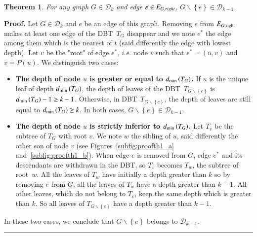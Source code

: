 \documentclass[preprint]{elsarticle}
\newtheorem{theorem}{Theorem}
\newenvironment{proof}[1][Proof]{\textbf{#1.} }{\ \rule{0.5em}{0.5em}}
\newcommand{\set}[1]{\left\{ #1 \right\}}
\newcommand{\card}[1]{\left| #1 \right|}
\newcommand{\mcalg}{\mathcal{G}}
\newcommand{\mcald}{\mathcal{D}}
\newcommand{\ebt}{DBT}
\newcommand{\compbin}[1]{\mathcal{C}_{\mbox{\scriptsize{B}}}\left( #1 \right)}
\newcommand{\dmin}{d_{\mbox{\scriptsize{min}}}}
\newcommand{\eright}[1]{E_{#1, \mbox{\scriptsize{right}}}}
\begin{document}
\begin{theorem}
For any graph $G \in \mcald_k$ and edge $e \in E_{G, \emph{right}}$, $G \backslash \set{e} \in \mcald_{k-1}$.
\label{th:completebinary}
\end{theorem}
\begin{proof}
Let $G \in \mcald_k$ and $e$ be an edge of this graph. Removing $e$ from $\eright{G}$ makes at least one edge of the \ebt ~$T_G$ disappear and we note $e^*$ the edge among them which is the nearest of $t$ (said differently the edge with lowest depth). Let $v$ be the "root" of edge $e^*$, {\em i.e.} node $v$ such that $e^* = (u, v)$ and $v = P(u)$. We distinguish two cases:
\begin{itemize}[leftmargin=0.3cm]
\item {\bf The depth of node $u$ is greater or equal to $\dmin\left(T_G\right)$.} If $u$ is the unique leaf of depth $\dmin\left(T_G\right)$, the depth of leaves of the \ebt ~$T_{G\backslash \set{e}}$ is $\dmin\left(T_G\right) - 1 \geq k-1$. Otherwise, in \ebt ~$T_{G\backslash \set{e}}$, the depth of leaves are still equal to $\dmin\left(T_G\right) \geq k$. In both cases, $G\backslash \set{e} \in \mcald_{k-1}$.
\item {\bf The depth of node $u$ is strictly inferior to $\dmin\left(T_G\right)$.} Let $T_v$ be the subtree of $T_G$ with root $v$. We note $w$ the sibling of $u$, said differently the other son of node $v$ (see Figures~\ref{subfig:proofth1_a} and~\ref{subfig:proofth1_b}). 
When edge $e$ is removed from $G$, edge $e^*$ and its descendants are withdrawn in the \ebt , so $T_v$ becomes $T_w$, the subtree of root~$w$. All the leaves of $T_w$ have initially a depth greater than $k$ so by removing $e$ from $G$, all the leaves of $T_w$ have a depth greater than $k-1$. All other leaves, which do not belong to $T_v$, keep the same depth which is greater than $k$. So all leaves of $T_{G \backslash \set{e}}$ have a depth greater than $k-1$.
\end{itemize}
In these two cases, we conclude that $G\backslash \set{e}$ belongs to  
$\mcald_{k-1}$.
\end{proof}
\end{document}
